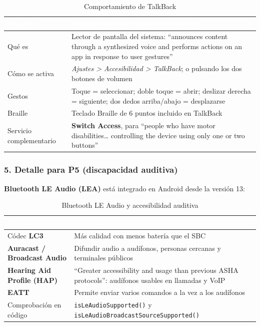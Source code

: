 \documentclass[11pt,a4paper]{article}
\newcommand{\code}[1]{\texttt{\color{primary}#1}}
\begin{document}
	\begin{table}[htbp]
		\centering
		\small
		\begin{tabularx}{\textwidth}{@{}>{\RaggedRight\arraybackslash}p{3cm} >{\RaggedRight\arraybackslash}X@{}}
			\toprule
			\rowcolor{primary}
			\textcolor{white}{\sffamily\bfseries Aspecto} & \textcolor{white}{\sffamily\bfseries Comportamiento oficial de TalkBack} \\
			\midrule
			Qué es & Lector de pantalla del sistema: \enquote{announces content through a synthesized voice and performs actions on an app in response to user gestures} \\
			\rowcolor{soft}
			Cómo se activa & \emph{Ajustes > Accesibilidad > TalkBack}; o pulsando los dos botones de volumen \\
			Gestos & Toque = seleccionar; doble toque = abrir; deslizar derecha = siguiente; dos dedos arriba/abajo = desplazarse \\
			\rowcolor{soft}
			Braille & Teclado Braille de 6 puntos incluido en TalkBack \\
			Servicio complementario & \textbf{Switch Access}, para \enquote{people who have motor disabilities\ldots{} controlling the device using only one or two buttons} \\
			\bottomrule
		\end{tabularx}
		\caption{Comportamiento de TalkBack}
	\end{table}
	
	\subsubsection*{5. Detalle para P5 (discapacidad auditiva)}
	
	\textbf{Bluetooth LE Audio (LEA)} está integrado en Android desde la versión 13:
	
	\begin{table}[htbp]
		\centering
		\small
		\begin{tabularx}{\textwidth}{@{}>{\RaggedRight\arraybackslash}p{4cm} >{\RaggedRight\arraybackslash}X@{}}
			\toprule
			\rowcolor{primary}
			\textcolor{white}{\sffamily\bfseries Función} & \textcolor{white}{\sffamily\bfseries Qué aporta} \\
			\midrule
			Códec \textbf{LC3} & Más calidad con menos batería que el SBC \\
			\rowcolor{soft}
			\textbf{Auracast / Broadcast Audio} & Difundir audio a audífonos, personas cercanas y terminales públicos \\
			\textbf{Hearing Aid Profile (HAP)} & \enquote{Greater accessibility and usage than previous ASHA protocols}: audífonos usables en llamadas y VoIP \\
			\rowcolor{soft}
			\textbf{EATT} & Permite enviar varios comandos a la vez a los audífonos \\
			Comprobación en código & \code{isLeAudioSupported()} y \code{isLeAudioBroadcastSourceSupported()} \\
			\bottomrule
		\end{tabularx}
		\caption{Bluetooth LE Audio y accesibilidad auditiva}
	\end{table}
	
\end{document}
